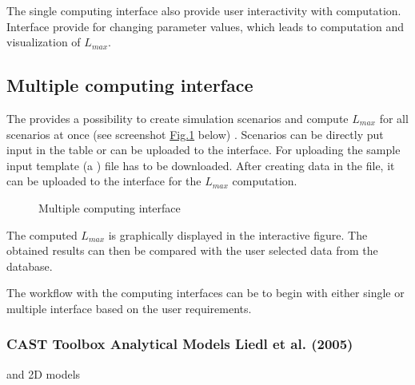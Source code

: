 \documentclass[letterpaper,10pt,english]{sphinxmanual}
\begin{document}
\sphinxAtStartPar
The single computing interface also provide user interactivity with computation. Interface provide  for changing parameter values, which leads to computation and visualization of \(L_{max}\).


\subsection{Multiple computing interface}
\label{\detokenize{contents/toolbox/an_model/an_model:multiple-computing-interface}}
\sphinxAtStartPar
The  provides a possibility to create simulation scenarios and compute \(L_{max}\) for all scenarios at once (see screenshot \hyperref[\detokenize{contents/toolbox/an_model/an_model:mcm}]{Fig.\@ \ref{\detokenize{contents/toolbox/an_model/an_model:mcm}}} below) . Scenarios can be directly put input in the table or can be uploaded to the interface. For uploading the sample input template (a ) file has to be downloaded. After creating data in the  file, it can be uploaded to the interface for the \(L_{max}\) computation.

\begin{figure}[htbp]
\centering
\capstart

\noindent{}
\caption{Multiple computing interface}\label{\detokenize{contents/toolbox/an_model/an_model:mcm}}\end{figure}

\sphinxAtStartPar
The computed \(L_{max}\) is graphically displayed in the interactive figure. The obtained results can then be compared with the user selected data from the database.

\sphinxAtStartPar
The workflow with the computing interfaces can be to begin with either single or multiple interface based on the user requirements.


\subsubsection{CAST Toolbox \sphinxhyphen{} Analytical Models \sphinxhyphen{} Liedl et al. (2005)}
\label{\detokenize{contents/toolbox/an_model/liedl2005:cast-toolbox-analytical-models-liedl-et-al-2005}}\label{\detokenize{contents/toolbox/an_model/liedl2005::doc}}
\sphinxAtStartPar
{} and  \sphinxhyphen{} 2D models
\end{document}
